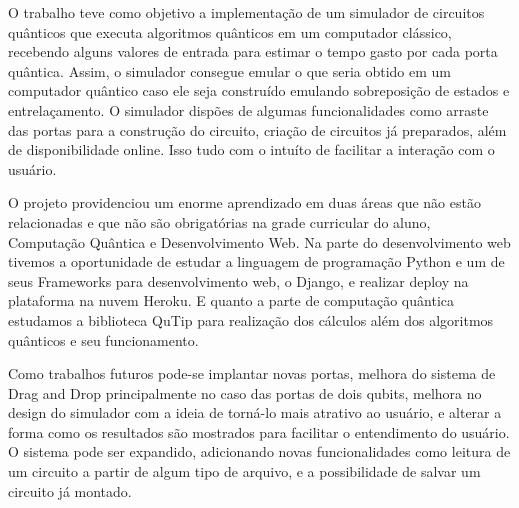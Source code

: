 \documentclass[a4paper, 12pt, oneside]{book}
\begin{document}
O trabalho teve como objetivo a implementação de um simulador de circuitos quânticos que executa algoritmos quânticos em um computador clássico, recebendo alguns valores de entrada para estimar o tempo gasto por cada porta quântica. Assim, o simulador consegue emular o que seria obtido em um computador quântico caso ele seja construído emulando sobreposição de estados e entrelaçamento. O simulador dispões de algumas funcionalidades como arraste das portas para a construção do circuito, criação de circuitos já preparados, além de disponibilidade online. Isso tudo com o intuíto de facilitar a interação com o usuário.

O projeto providenciou um enorme aprendizado em duas áreas que não estão relacionadas e que não são obrigatórias na grade curricular do aluno, Computação Quântica e Desenvolvimento Web. Na parte do desenvolvimento web tivemos a oportunidade de estudar a linguagem de programação Python e um de seus Frameworks para desenvolvimento web, o Django, e realizar deploy na plataforma na nuvem Heroku. E quanto a parte de computação quântica estudamos a biblioteca QuTip para realização dos cálculos além dos algoritmos quânticos e seu funcionamento. 

Como trabalhos futuros pode-se implantar novas portas, melhora do sistema de Drag and Drop principalmente no caso das portas de dois qubits, melhora no design do simulador com a ideia de torná-lo mais atrativo ao usuário, e alterar a forma como os resultados são mostrados para facilitar o entendimento do usuário. O sistema pode ser expandido, adicionando novas funcionalidades como leitura de um circuito a partir de algum tipo de arquivo, e a possibilidade de salvar um circuito já montado.



\end{document}
